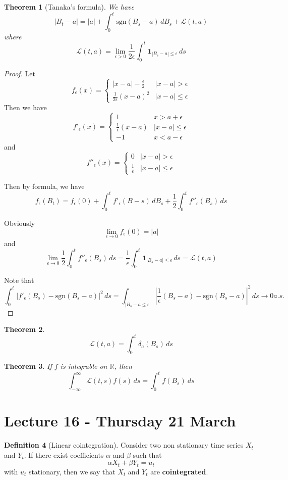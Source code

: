 \documentclass[10pt, oneside, reqno]{amsart}
\theoremstyle{plain}%
\newtheorem{thm}{Theorem}[section]
\theoremstyle{definition}
\newtheorem{defn}[thm]{Definition}
\theoremstyle{remark}
\newcommand{\R}{\mathbb{R}}
\begin{document}
\begin{thm}[Tanaka's formula]
	We have \[
		|B_t - a | = |a| + \int_0^t \text{sgn}(B_s - a) \, dB_s + \mathcal L(t, a)
	\] where \[\mathcal L(t,a) = \lim_{\epsilon > 0} \frac{1}{2 \epsilon} \int_0^t \mathbf{1}_{|B_s - a| \leq \epsilon} \, ds
 	\]
\end{thm}
\begin{proof}
	Let \[
		f_\epsilon(x) = \begin{cases}
			|x-a| - \frac{\epsilon}{2} &|x-a| > \epsilon \\
			\frac{1}{2 \epsilon}(x-a)^2 &|x-a| \leq \epsilon
		\end{cases}
	\]  Then we have \[
		f'_\epsilon(x) = \begin{cases}
			1 &x > a + \epsilon \\
			\frac{1}{\epsilon}(x-a) &|x-a| \leq \epsilon \\
			-1 &x < a - \epsilon
		\end{cases}
	\] and \[
	f''_\epsilon(x) = \begin{cases}
		0 &|x-a| > \epsilon \\
		\frac{1}{\epsilon} &|x-a| \leq \epsilon
	\end{cases}	
	\]
	
	Then by \itos formula, we have \[
		f_\epsilon(B_t) = f_\epsilon(0) + \int_0^t f'_\epsilon(B-s) \, dB_s + \frac{1}{2} \int_0^t f''_\epsilon(B_s) \, ds	\]
		
	Obviously \[
		\lim_{\epsilon \rightarrow 0} f_\epsilon(0) = |a|
	\] and \[
		\lim_{\epsilon \rightarrow 0} \frac{1}{2} \int_0^t f''_\epsilon(B_s) \, ds = \frac{1}{\epsilon} \int_0^t \mathbf{1}_{|B_s - a| \leq \epsilon} \, ds = \mathcal L(t, a)
	\]
	
	Note that \[
		\int_0^t \left| f'_\epsilon(B_s) - \text{sgn}(B_s  - a) \right|^2 \, ds =  \int_{|B_s - a \leq \epsilon} \left| \frac{1}{\epsilon}(B_s - a) - \text{sgn}(B_s - a) \right|^2 \, ds \rightarrow 0 a.s.
	\]
\end{proof}

\begin{thm}
	\[
		\mathcal L(t,a) = \int_0^t \delta_a(B_s) \,ds
	\]
\end{thm}
\begin{thm}
	If $f$ is integrable on $\R$, then \[
		\int_{-\infty}^\infty \mathcal L(t,s) f(s) \, ds = \int_0^t f(B_s) \ ds
	\]
\end{thm}

\section{Lecture 16 - Thursday 21 March} %
\label{sec:lecture_16_thursday_21_march}
\begin{defn}[Linear cointegration]
	Consider two non stationary time series $X_t$ and $Y_t$.  If there exist coefficients $\alpha$ and $\beta$ such that \[
		\alpha X_t + \beta Y_t = u_t
	\] with $u_t$ stationary, then we say that $X_t$ and $Y_t$ are \textbf{cointegrated}.  
\end{defn}
\end{document}
